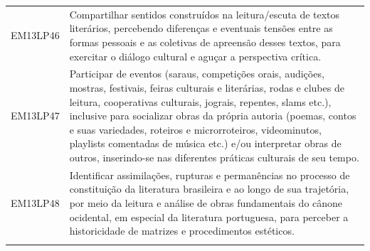 \documentclass[12pt]{extarticle}
\begin{document}
\begin{longtable}{ll}
EM13LP46   & Compartilhar sentidos construídos na leitura/escuta de textos literários, percebendo diferenças e eventuais tensões entre as formas pessoais e as coletivas de apreensão desses textos, para exercitar o diálogo cultural e aguçar a perspectiva crítica.                                                                                                                                                                                                                                                                                                                                                                                                                                                                                                                                                             \\
\rowcolor[HTML]{E0F7FA} 
EM13LP47   & Participar de eventos (saraus, competições orais, audições, mostras, festivais, feiras culturais e literárias, rodas e clubes de leitura, cooperativas culturais, jograis, repentes, slams etc.), inclusive para socializar obras da própria autoria (poemas, contos e suas variedades, roteiros e microrroteiros, videominutos, playlists comentadas de música etc.) e/ou interpretar obras de outros, inserindo-se nas diferentes práticas culturais de seu tempo.                                                                                                                                                                                                                                                                                                                                                  \\
\rowcolor[HTML]{FFF} 
EM13LP48   & Identificar assimilações, rupturas e permanências no processo de constituição da literatura brasileira e ao longo de sua trajetória, por meio da leitura e análise de obras fundamentais do cânone ocidental, em especial da literatura portuguesa, para perceber a historicidade de matrizes e procedimentos estéticos.                                                                                                                                                                                                                                                                                                                                                                                                                                                                                              \\
\rowcolor[HTML]{E0F7FA} 

\end{longtable}
\end{document}
